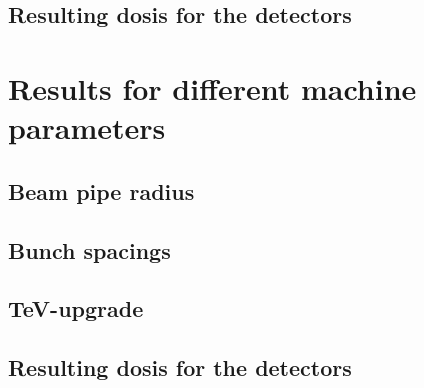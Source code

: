 \subsection{Resulting dosis for the detectors}
\label{EffectDetectors:BeamOrbit:dosis}

\section{Results for different machine parameters}
\label{EffectDetectors:MachineParameters}
\subsection{Beam pipe radius}
\label{EffectDetectors:MachineParameters:beampipe}
\subsection{Bunch spacings}
\label{EffectDetectors:MachineParameters:bunchspacing}
\subsection{TeV-upgrade}
\label{EffectDetectors:MachineParameters:upgrade}
\subsection{Resulting dosis for the detectors}
\label{EffectDetectors:MachineParameters:dosis}

